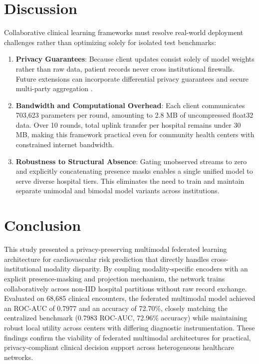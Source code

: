 \documentclass[10pt,conference]{IEEEtran}
\begin{document}
\vspace{1.2ex}

\section{Discussion}
Collaborative clinical learning frameworks must resolve real-world deployment challenges rather than optimizing solely for isolated test benchmarks:
\begin{enumerate}
    \item \textbf{Privacy Guarantees}: Because client updates consist solely of model weights rather than raw data, patient records never cross institutional firewalls. Future extensions can incorporate differential privacy guarantees and secure multi-party aggregation \cite{bonawitz2017practical}.
    \item \textbf{Bandwidth and Computational Overhead}: Each client communicates 703,623 parameters per round, amounting to 2.8 MB of uncompressed float32 data. Over 10 rounds, total uplink transfer per hospital remains under 30 MB, making this framework practical even for community health centers with constrained internet bandwidth.
    \item \textbf{Robustness to Structural Absence}: Gating unobserved streams to zero and explicitly concatenating presence masks enables a single unified model to serve diverse hospital tiers. This eliminates the need to train and maintain separate unimodal and bimodal model variants across institutions.
\end{enumerate}

\section{Conclusion}
This study presented a privacy-preserving multimodal federated learning architecture for cardiovascular risk prediction that directly handles cross-institutional modality disparity. By coupling modality-specific encoders with an explicit presence-masking and projection mechanism, the network trains collaboratively across non-IID hospital partitions without raw record exchange. Evaluated on 68,685 clinical encounters, the federated multimodal model achieved an ROC-AUC of 0.7977 and an accuracy of 72.70\%, closely matching the centralized benchmark (0.7983 ROC-AUC, 72.96\% accuracy) while maintaining robust local utility across centers with differing diagnostic instrumentation. These findings confirm the viability of federated multimodal architectures for practical, privacy-compliant clinical decision support across heterogeneous healthcare networks.
\end{document}
